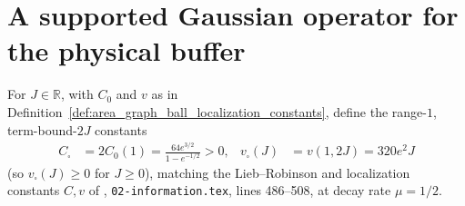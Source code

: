 \section{A supported Gaussian operator for the physical buffer}

\begin{definition}
    \label{def:peps_square_localization_constants}
    \leanok
    For $J\in\mathbb R$, with $C_0$ and $v$ as in
    Definition~\ref{def:area_graph_ball_localization_constants}, define the
    range-$1$, term-bound-$2J$ constants
    \begin{align}
        C_\square    & =2C_0(1)=\frac{64e^{3/2}}{1-e^{-1/2}}>0, &
        v_\square(J) & =v(1,2J)=320e^2J
        \label{eq:peps_square_localization_constants}
    \end{align}
    (so $v_\square(J)\geq0$ for $J\geq0$), matching the Lieb--Robinson and
    localization constants $C,v$ of \cite{OpenAI2026PolynomialPEPS},
    \texttt{02-information.tex}, lines 486--508, at decay rate $\mu=1/2$.
\end{definition}

